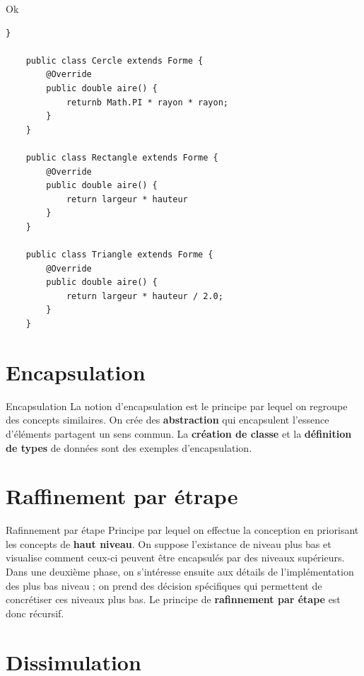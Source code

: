 \documentclass[16pt]{report}
\begin{document}
\begin{multicols*}{2}
\begin{EExample}{Ok}{}
\begin{lstlisting}[style=JavaDraculaWhite]
    } 

    public class Cercle extends Forme {
        @Override 
        public double aire() {
            returnb Math.PI * rayon * rayon; 
        }
    }
    
    public class Rectangle extends Forme { 
        @Override 
        public double aire() {
            return largeur * hauteur
        }
    }

    public class Triangle extends Forme { 
        @Override
        public double aire() {
            return largeur * hauteur / 2.0;
        }
    }

\end{lstlisting}
\end{EExample}


        \section{Encapsulation}

        \begin{Definitionx}{Encapsulation}{}
            La notion d'encapsulation est le principe par lequel on regroupe des concepts similaires. 
            On crée des \textbf{abstraction} qui \textcolor{myb}{encapsulent} l'essence d'éléments 
            partagent un sens commun. La \textbf{création de classe} et la \textbf{définition de types} 
            de données sont des exemples d'encapsulation. 
        \end{Definitionx}               

        \section{Raffinement par étrape}

        \begin{Concept}{Rafinnement par étape}{}
            Principe par lequel on effectue la conception en priorisant les concepts de 
            \textbf{haut niveau}. On suppose l'existance de niveau plus bas et visualise 
            comment ceux-ci peuvent être encapsulés par des niveaux supérieurs. 
            Dans une deuxième phase, on s'intéresse ensuite aux détails de l'implémentation 
            des plus bas niveau ; on prend des décision spécifiques qui permettent de concrétiser 
            ces niveaux plus bas. Le principe de \textbf{rafinnement par étape} est donc \textcolor{myb}{récursif}.      
        \end{Concept}

        \section{Dissimulation}



\end{multicols*}
\end{document}
